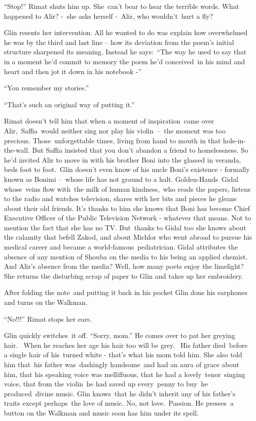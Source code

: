 \documentclass[twoside,11pt]{book}
\begin{document}
{{}``Stop!'' Rimat }shuts him
up{. She\ can{}'t bear to hear the terrible words. What happened to
Alir? -\ she asks herself -\ Alir, who wouldn't~hurt a fly?}

{Glin }resents her intervention. All he wanted to do
was{ explain how overwhelmed he was by the third and last line -- how
its deviation from the poem's initial structure sharpened its meaning. Instead he says:\ {}``The way he used to say
that in a moment he'd commit to memory the poem }he'd conceived\ in his mind and heart
{and then jot it down in his notebook -{}'' }

{}``You remember my stories.'' 

``That's such an original way of putting it.''

{Rimat doesn{}'t tell him that when a moment of inspiration~came over
Alir,~Saffia~would neither sing nor play his violin\ {}--\ the moment was too precious. Those~unforgettable times,
living from hand to mouth in that hole-in-the-wall. But Saffia insisted that you don't abandon a friend to
homelessness. So} he{}'d invited Alir to move in with his brother Boni into the glassed in veranda, beds foot to
foot.\ Glin doesn't even know of his uncle Boni{}'s existence - formally known as Bonimi --\ whose life has not ground
to a halt. Golden-Hands\ Gidal whose\ veins flow with\ the milk of human kindness,~who reads the papers, listens to the
radio and watches television, shares with her bits and pieces he gleans about their old friends. It's thanks to him she
knows that Boni has become Chief Executive Officer of the Public Television Network - whatever that means. Not to
mention the fact that she has no TV. But~thanks to Gidal too she knows about the calamity that befell Zakod, and about
Michlor who went abroad to pursue his medical career and became a world-famous\ pediatrician. Gidal attributes the
absence of any mention of Shouba on the media to his being an applied chemist. And Alir's absence from the media? Well,
how many poets enjoy the limelight? She returns the disturbing scr{ap
of paper to Glin and takes up her embroidery.}

{After folding the
}note{\ }{and putting it back
in his pocket Glin dons his earphones and turns on the Walkman. }

{}``No!!!'' Rimat stops her ears. 

{Glin }quickly
switches\ {it off. ``Sorry, mom.'' }He comes over to pat her greying
hair.~ When he reaches her age his hair too will be grey.~ His father died~before a single hair of his\ turned white -
that's what his mom told him.  She also told him that{\ }his father was\ dashingly handsome\ and had an
aura of grace about him, that his speaking voice was mellifluous, that he had a lovely\ tenor\ singing voice, that from
the violin~he had saved up every\ penny to buy\ he produced\ divine music. Glin knows~that
{he didn{}'t inherit any of his father's traits except perhaps\ the
love of music. No, not love.~Passion. He }presses\ {a button on the
Walkman and }music soon has him under its spell.~ 
\end{document}
